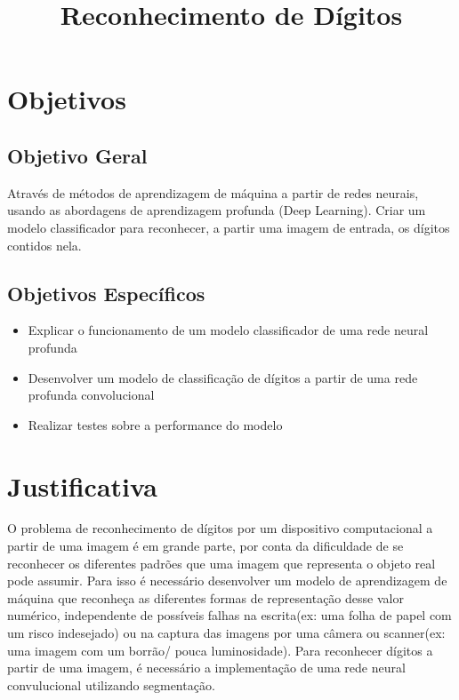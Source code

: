 \documentclass[conference]{IEEEtran}
\begin{document}
\title{Reconhecimento de Dígitos}

\author{
\and
{}

}

\maketitle





\section{Objetivos}
\subsection{Objetivo Geral}
Através de métodos de aprendizagem de máquina a partir de redes neurais, usando as abordagens de aprendizagem profunda (Deep Learning). Criar um modelo classificador para reconhecer, a partir uma imagem de entrada, os dígitos contidos nela.
\subsection{Objetivos Específicos}
\begin{itemize}
\item  Explicar o funcionamento de um modelo classificador de uma rede neural profunda
\item  Desenvolver um modelo de classificação de dígitos a partir de uma rede profunda convolucional
\item  Realizar testes sobre a performance do modelo
\end{itemize}
\section{Justificativa}

O problema de reconhecimento de dígitos por um dispositivo computacional a partir de uma imagem é em grande parte, por conta da dificuldade de se reconhecer os diferentes padrões que uma imagem que representa o objeto real pode assumir.
Para isso é necessário desenvolver um modelo de aprendizagem de máquina que reconheça as diferentes formas de representação desse valor numérico, independente de possíveis falhas na escrita(ex: uma folha de papel com um risco indesejado) ou na captura das imagens por uma câmera ou scanner(ex: uma imagem com um borrão/ pouca luminosidade).
Para reconhecer dígitos a partir de uma imagem, é necessário a implementação de uma rede neural convulucional utilizando segmentação. 
\end{document}
